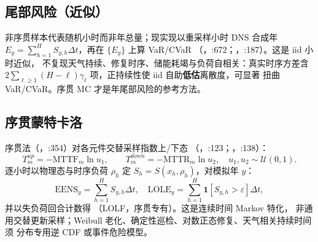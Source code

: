 \subsection{尾部风险（近似）}
非序贯样本代表随机小时而非年总量；现实现以重采样小时 DNS 合成年
$E_y=\sum_{h=1}^H S_{y,h}\Delta t$，再在 $\{E_y\}$ 上算 VaR/CVaR
（，:672；，:187）。这是 iid 小时近似，
不复现天气持续、修复时序、储能耗竭与负荷自相关：真实时序方差含
$2\sum_{\ell\ge1}(H-\ell)\gamma_\ell$ 项，正持续性使 iid 自助\textbf{低估}离散度，可显著
扭曲 VaR/CVaR。序贯 MC 才是年尾部风险的参考方法。

\subsection{序贯蒙特卡洛}
序贯法（，:354）对各元件交替采样指数上/下态
（，:123；，:138）：
\begin{equation}
T_m^{up}=-\mathrm{MTTF}_m\ln u_1,\qquad T_m^{down}=-\mathrm{MTTR}_m\ln u_2,\quad u_1,u_2\sim\mathcal U(0,1).
\end{equation}
逐小时以物理态与时序负荷 $\rho_h$ 定 $S_h=S(x_h,\rho_h)$，对模拟年 $y$：
\begin{equation}
\mathrm{EENS}_y=\sum_{h=1}^H S_{y,h}\Delta t,\quad
\mathrm{LOLE}_y=\sum_{h=1}^H\mathbf 1[S_{y,h}>\varepsilon]\Delta t,
\end{equation}
并以失负荷回合计数得 （LOLF，序贯专有）。这是连续时间 Markov 特化，
非通用交替更新采样；Weibull 老化、确定性巡检、对数正态修复、天气相关持续时间须
分布专用逆 CDF 或事件危险模型。
